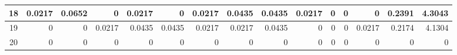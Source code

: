 \begin{table}[hb!]
\begin{adjustbox}{width = \textwidth, center}
\begin{tabular}{|c|r|r|r|r|r|r|r|r|r|r|r|r|r|r|}
        \cellcolor[HTML]{CFE2F3}18                                  & \cellcolor[HTML]{C7E9D8}0.0217                 & \cellcolor[HTML]{57BB8A}0.0652                 & \cellcolor[HTML]{FFFFFF}0                      & \cellcolor[HTML]{C7E9D8}0.0217                 & \cellcolor[HTML]{FFFFFF}0                      & \cellcolor[HTML]{C7E9D8}0.0217                 & \cellcolor[HTML]{8FD2B1}0.0435                 & \cellcolor[HTML]{8FD2B1}0.0435                  & \cellcolor[HTML]{C7E9D8}0.0217                  & \cellcolor[HTML]{FFFFFF}0                       & \cellcolor[HTML]{FFFFFF}0                       & \cellcolor[HTML]{FFFFFF}0                       & \cellcolor[HTML]{D9D2E9}0.2391                                                  & \cellcolor[HTML]{D9D2E9}4.3043                                                        \\ \hline
        \cellcolor[HTML]{CFE2F3}19                                  & \cellcolor[HTML]{FFFFFF}0                      & \cellcolor[HTML]{FFFFFF}0                      & \cellcolor[HTML]{C7E9D8}0.0217                 & \cellcolor[HTML]{8FD2B1}0.0435                 & \cellcolor[HTML]{8FD2B1}0.0435                 & \cellcolor[HTML]{C7E9D8}0.0217                 & \cellcolor[HTML]{C7E9D8}0.0217                 & \cellcolor[HTML]{8FD2B1}0.0435                  & \cellcolor[HTML]{FFFFFF}0                       & \cellcolor[HTML]{FFFFFF}0                       & \cellcolor[HTML]{FFFFFF}0                       & \cellcolor[HTML]{C7E9D8}0.0217                  & \cellcolor[HTML]{D9D2E9}0.2174                                                  & \cellcolor[HTML]{D9D2E9}4.1304                                                        \\ \hline
        \rowcolor[HTML]{FFFFFF} 
        \cellcolor[HTML]{CFE2F3}20                                  & 0                                              & 0                                              & 0                                              & 0                                              & 0                                              & 0                                              & 0                                              & 0                                               & 0                                               & 0                                               & 0                                               & 0                                               & \cellcolor[HTML]{D9D2E9}0                                                       & \cellcolor[HTML]{D9D2E9}0                                                             \\ \hline

\end{tabular}
\end{adjustbox}
\end{table}
